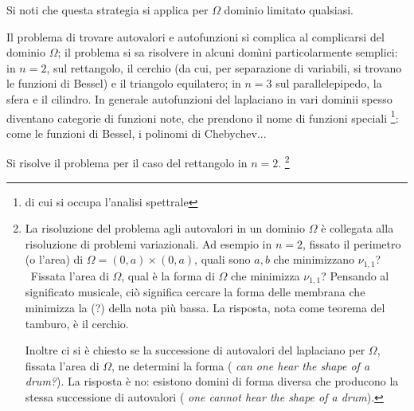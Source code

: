 \documentclass{article}
\begin{document}
Si noti che questa strategia si applica per $\Omega $ dominio limitato
qualsiasi.

Il problema di trovare autovalori e autofunzioni si complica al complicarsi
del dominio $\Omega $; il problema si sa risolvere in alcuni dom\`{\i}ni
particolarmente semplici: in $n=2$, sul rettangolo, il cerchio (da cui, per
separazione di variabili, si trovano le funzioni di Bessel) e il triangolo
equilatero; in $n=3$ sul parallelepipedo, la sfera e il cilindro. In
generale autofunzioni del laplaciano in vari dominii spesso diventano
categorie di funzioni note, che prendono il nome di funzioni speciali%
\footnote{%
di cui si occupa l'analisi spettrale}: come le funzioni di Bessel, i
polinomi di Chebychev...

Si risolve il problema per il caso del rettangolo in $n=2$. \footnote{%
La risoluzione del problema agli autovalori in un dominio $\Omega $ \`{e}
collegata alla risoluzione di problemi variazionali. Ad esempio in $n=2$,
fissato il perimetro (o l'area) di $\Omega =\left( 0,a\right) \times \left(
0,a\right) $, quali sono $a,b$ che minimizzano $\nu _{1,1}$? \ Fissata
l'area di $\Omega $, qual \`{e} la forma di $\Omega $ che minimizza $\nu
_{1,1}$? Pensando al significato musicale, ci\`{o} significa cercare la
forma delle membrana che minimizza la (?) della nota pi\`{u} bassa. La
risposta, nota come teorema del tamburo, \`{e} il cerchio.
\par
Inoltre ci si \`{e} chiesto se la successione di autovalori del laplaciano
per $\Omega $, fissata l'area di $\Omega $, ne determini la forma (\textit{%
can one hear the shape of a drum?}). La risposta \`{e} no: esistono domini
di forma diversa che producono la stessa successione di autovalori (\textit{%
one cannot hear the shape of a drum}).}
\end{document}

